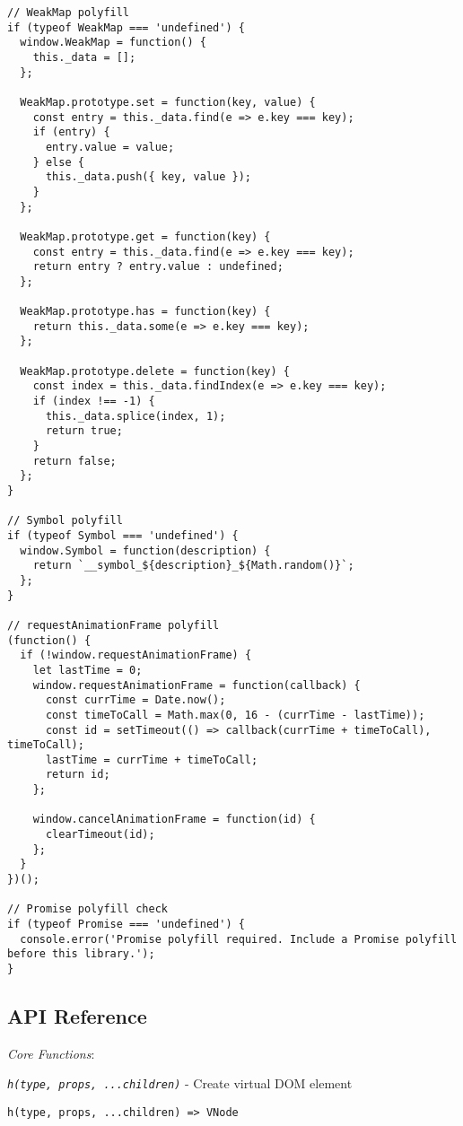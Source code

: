 \documentclass[11pt]{article}
\begin{document}
\begin{verbatim}
// WeakMap polyfill
if (typeof WeakMap === 'undefined') {
  window.WeakMap = function() {
    this._data = [];
  };
  
  WeakMap.prototype.set = function(key, value) {
    const entry = this._data.find(e => e.key === key);
    if (entry) {
      entry.value = value;
    } else {
      this._data.push({ key, value });
    }
  };
  
  WeakMap.prototype.get = function(key) {
    const entry = this._data.find(e => e.key === key);
    return entry ? entry.value : undefined;
  };
  
  WeakMap.prototype.has = function(key) {
    return this._data.some(e => e.key === key);
  };
  
  WeakMap.prototype.delete = function(key) {
    const index = this._data.findIndex(e => e.key === key);
    if (index !== -1) {
      this._data.splice(index, 1);
      return true;
    }
    return false;
  };
}

// Symbol polyfill
if (typeof Symbol === 'undefined') {
  window.Symbol = function(description) {
    return `__symbol_${description}_${Math.random()}`;
  };
}

// requestAnimationFrame polyfill
(function() {
  if (!window.requestAnimationFrame) {
    let lastTime = 0;
    window.requestAnimationFrame = function(callback) {
      const currTime = Date.now();
      const timeToCall = Math.max(0, 16 - (currTime - lastTime));
      const id = setTimeout(() => callback(currTime + timeToCall), timeToCall);
      lastTime = currTime + timeToCall;
      return id;
    };
    
    window.cancelAnimationFrame = function(id) {
      clearTimeout(id);
    };
  }
})();

// Promise polyfill check
if (typeof Promise === 'undefined') {
  console.error('Promise polyfill required. Include a Promise polyfill before this library.');
}
\end{verbatim}
\subsection{API Reference}
\label{sec:org5976f3e}

\emph{Core Functions}:

\emph{\texttt{h(type, props, ...children)}} - Create virtual DOM element

\begin{verbatim}
h(type, props, ...children) => VNode
\end{verbatim}
\end{document}

